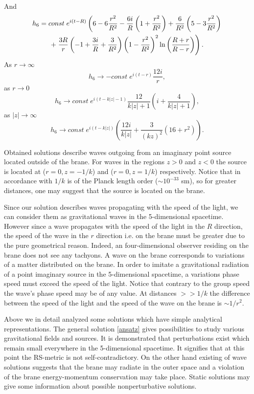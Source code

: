 \documentclass[letterpaper,12pt]{article}
\begin{document}
And
\begin{gather}
 h_6=const\; e^{i(t-R)}\left(6 - 6
 \frac{r^2}{R^2} -
 \frac{6i}{R}\left(1 + \frac{r^2}{R^2}\right) +
 \frac{6}{R^2}\left(5 - 3
 \frac{r^2}{R^2}\right)\right.\notag \\
 +\left.
\frac{3R}{r}\left(-1+\frac{3i}{R}+\frac{3}{R^2}\right) \left(1-
\frac{r^2}{R^2}\right)^2
 \ln\left(\frac{R+r}{R-r}\right)\right).
\end{gather}
As $r\to \infty$
\begin {equation}
\label{}
 h_6\to -const\; e^{i(t-r)}\frac{12i}{r},
\end{equation}
as $r\to 0$ \begin {equation} \label{}
 h_6\to const\; e^{i(t-k|z|-1)}\frac{12}{k|z|+1}\left(i +\frac{4}{k|z|+1}\right),
\end{equation}
as $|z|\to \infty$
\begin {equation}
\label{}
 h_6\to const\; e^{i(t-k|z|)}\left(\frac{12i}{k|z|} +
  \frac{3}{(kz)^2}\left(16 + r^2\right)\right).
\end{equation}

Obtained solutions describe waves outgoing from an imaginary point
source located outside of the brane. For waves in the regions
$z>0$ and $z<0$ the source is located  at ($r=0, z=-1/k$)  and
($r=0, z=1/k$) respectively.  Notice that in accordance with
\cite{Randall99a}  $1/k$ is of the Planck length order ($\sim
10^{-33}$ sm), so for greater distances, one may suggest that the
source is located on the brane.


Since our solution describes waves propagating with the speed of
the light, we can consider them as gravitational waves in the
5-dimensional spacetime. However since a wave propagates with the
speed of the light in the $R$ direction, the speed of the wave in
the $r$ direction i.e. on the brane must be greater due to the
pure geometrical reason. Indeed, an four-dimensional observer
residing on the brane does not see any tachyons. A wave on the
brane corresponds to variations of a matter distributed on the
brane. In order to imitate a gravitational radiation of a  point
imaginary source in the 5-dimensional spacetime, a variations
phase speed must exceed the speed  of the light.  Notice that
contrary to the group speed the wave's phase speed may be of any
value. At distances $>>1/k$ the difference between the speed of
the light  and the speed of the wave on the brane is $\sim 1/r^2$.

\bigskip
Above we in detail analyzed some solutions which have simple
analytical representations. The general solution \eqref{ansatz}
gives possibilities to study various gravitational fields and
sources. It is demonstrated that perturbations exist which remain
small everywhere in the 5-dimensional spacetime. It signifies that
at this point the RS-metric is not self-contradictory. On the
other hand existing of wave solutions suggests that the brane may
radiate in the outer space and a violation of the brane
energy-momentum conservation may take place. Static solutions may
give some information about possible nonperturbative solutions.
\end{document}
